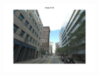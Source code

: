         \begin{minipage}{1.0\linewidth}
        \end{minipage}
        \begin{minipage}{0.34\linewidth}
            \centering
            \vspace{0mm}
            \includegraphics[trim = 45mm 40mm 45mm 30mm, clip=true,height=36mm]{imgs/Pval/exImproved02/query.jpg}
        \end{minipage}
